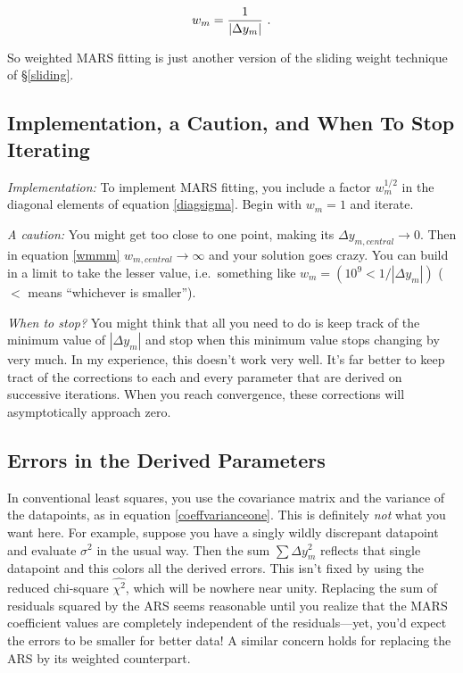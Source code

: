 \documentclass[psfig,preprint]{aastex}
\begin{document}
\begin{equation} \label{wmmm}
w_m = {1 \over |\Delta y_m|} \ .
\end{equation}

\noindent So weighted MARS fitting is just another version of the
sliding weight technique of \S \ref{sliding}. 

\subsection{Implementation, a Caution, and When To Stop Iterating}

{\it Implementation:} To implement MARS fitting, you include a factor
$w_m^{1/2}$ in the diagonal elements of equation \ref{diagsigma}. Begin
with $w_m = 1$ and iterate.

{\it A caution:} You might get too close to one point, making its $\Delta
y_{m, central} \rightarrow 0$. Then in equation \ref{wmmm} $w_{m,central}
\rightarrow \infty$ and your solution goes crazy.  You can build in a limit
to take the lesser value, i.e.\ something like $w_m = (10^9 < {1/|\Delta
  y_m|})$ ($<$ means ``whichever is smaller'').

{\it When to stop?} You might think that all you need to do is keep track
of the minimum value of $|\Delta y_m|$ and stop when this minimum value
stops changing by very much. In my experience, this doesn't work very
well. It's far better to keep tract of the corrections to each and every
parameter that are derived on successive iterations. When you reach
convergence, these corrections will asymptotically approach zero. 

\subsection{Errors in the Derived Parameters}

In conventional least squares, you use the covariance matrix and the
variance of the datapoints, as in equation \ref{coeffvarianceone}. This is
definitely {\it not} what you want here. For example, suppose you have a
singly wildly discrepant datapoint and evaluate $\sigma^2$ in the usual
way.  Then the sum $\sum \Delta y_m^2$ reflects that single datapoint and
this colors all the derived errors. This isn't fixed by using the reduced
chi-square $\widehat{\chi^2}$, which will be nowhere near unity. Replacing
the sum of residuals squared by the ARS seems reasonable until you realize
that the MARS coefficient values are completely independent of the
residuals---yet, you'd expect the errors to be smaller for better data! A
similar concern holds for replacing the ARS by its weighted counterpart.
\end{document}
